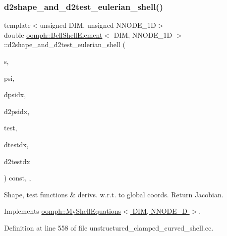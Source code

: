 \subsubsection{\texorpdfstring{d2shape\+\_\+and\+\_\+d2test\+\_\+eulerian\+\_\+shell()}{d2shape\_and\_d2test\_eulerian\_shell()}}
{\footnotesize\ttfamily template$<$unsigned D\+IM, unsigned N\+N\+O\+D\+E\+\_\+1D$>$ \\
double \hyperlink{classoomph_1_1BellShellElement}{oomph\+::\+Bell\+Shell\+Element}$<$ D\+IM, N\+N\+O\+D\+E\+\_\+1D $>$\+::d2shape\+\_\+and\+\_\+d2test\+\_\+eulerian\+\_\+shell (\begin{DoxyParamCaption}\item[{const Vector$<$ double $>$ \&}]{s,  }\item[{Shape \&}]{psi,  }\item[{D\+Shape \&}]{dpsidx,  }\item[{D\+Shape \&}]{d2psidx,  }\item[{Shape \&}]{test,  }\item[{D\+Shape \&}]{dtestdx,  }\item[{D\+Shape \&}]{d2testdx }\end{DoxyParamCaption}) const\hspace{0.3cm}{\ttfamily [inline]}, {\ttfamily [protected]}, {\ttfamily [virtual]}}



Shape, test functions \& derivs. w.\+r.\+t. to global coords. Return Jacobian. 



Implements \hyperlink{classoomph_1_1MyShellEquations_ae5efd29cb214218d41d29abab4dcec51}{oomph\+::\+My\+Shell\+Equations$<$ D\+I\+M, N\+N\+O\+D\+E\+\_\+D $>$}.



Definition at line 558 of file unstructured\+\_\+clamped\+\_\+curved\+\_\+shell.\+cc.

\mbox{\label{classoomph_1_1BellShellElement_a56fcbf1446e8797e3066c802140d5baf}} 
